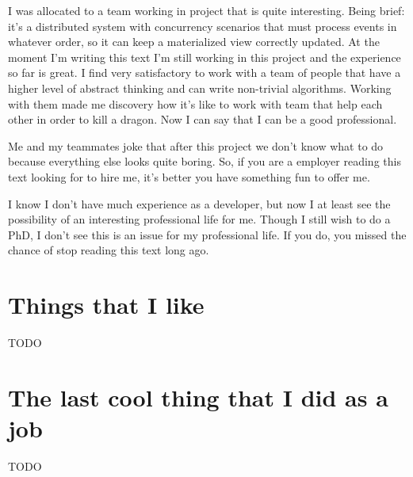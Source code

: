 \documentclass[11pt,a4paper,sans]{moderncv}
\begin{document}
\medskip

I was allocated to a team working in project that is quite interesting.
Being brief: it's a distributed system with concurrency scenarios that must process events in whatever order, so it can keep a materialized view correctly updated.
At the moment I'm writing this text I'm still working in this project and the experience so far is great.
I find very satisfactory to work with a team of people that have a higher level of abstract thinking and can write non-trivial algorithms.
Working with them made me discovery how it's like to work with team that help each other in order to kill a dragon.
Now I can say that I can be a good professional.

\medskip

Me and my teammates joke that after this project we don't know what to do because everything else looks quite boring.
So, if you are a employer reading this text looking for to hire me, it's better you have something fun to offer me.

\medskip

I know I don't have much experience as a developer, but now I at least see the possibility of an interesting professional life for me.
Though I still wish to do a PhD, I don't see this is an issue for my professional life.
If you do, you missed the chance of stop reading this text long ago.

\section{Things that I like}
TODO

\section{The last cool thing that I did as a job}
TODO
\end{document}
